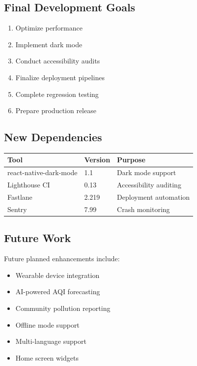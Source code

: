 \documentclass[12pt]{article}
\begin{document}
\subsection{Final Development Goals}

\begin{enumerate}
    \item Optimize performance
    \item Implement dark mode
    \item Conduct accessibility audits
    \item Finalize deployment pipelines
    \item Complete regression testing
    \item Prepare production release
\end{enumerate}

\subsection{New Dependencies}

\begin{longtable}{|p{5cm}|p{3cm}|p{5cm}|}
\hline
\textbf{Tool} & \textbf{Version} & \textbf{Purpose} \\
\hline
react-native-dark-mode & 1.1 & Dark mode support \\
\hline
Lighthouse CI & 0.13 & Accessibility auditing \\
\hline
Fastlane & 2.219 & Deployment automation \\
\hline
Sentry & 7.99 & Crash monitoring \\
\hline
\end{longtable}

\subsection{Future Work}

Future planned enhancements include:

\begin{itemize}
    \item Wearable device integration
    \item AI-powered AQI forecasting
    \item Community pollution reporting
    \item Offline mode support
    \item Multi-language support
    \item Home screen widgets
\end{itemize}
\end{document}
